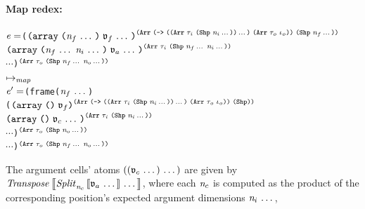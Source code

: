\begin{sproof}
  \paragraph{Map redex:}
  \newcommand{\mapfn}{\liftfn}
  \newcommand{\mapargannot}
  {\typearray
    {\type_i}
    {\idxshape{\sequence{\nat_f}\;\sequence{\nat_i}}}}
  \newcommand{\maparg}
  {\notedarrlit[\mapargannot]{\sequence{\atval_a}}{\sequence{\nat_f}\,\sequence{\nat_i}}}
  \newcommand{\mapresultannot}
  {\typearray
    {\type_o}
    {\idxshape{\sequence{\nat_f}\;\sequence{\nat_o}}}}
  \newcommand{\mapfncell}
  {\notedarrlit[{\typearray
      {\typefun
        {\sequence{\typearray{\type_i}{\idxshape{\sequence{\nat_i}}}}}
        {\typearray{\type_o}{\idx_o}}}
      {\idxshape{}}}]
    {\atval_f}{}}
  \newcommand{\mapargcell}
  {\notedarrlit[{\typearray{\type_i}{\idxshape{\sequence{\nat_i}}}}]
    {\sequence{\atval_c}}{}}
  \newcommand{\mappedargannot}
  {\typearray
    {\type_i}
    {\idxshape{\sequence{\nat_i}}}}
  \newcommand{\resultcellannot}
  {\typearray
    {\type_o}
    {\idxshape{\sequence{\nat_o}}}}
  \newcommand{\erasedmapfn}{\erasedliftfn}
  \newcommand{\erasedmaparg}
  {\arrlit{\sequence{\EraseA{\atval_a}}}{\sequence{\nat_f}\,\sequence{\nat_i}}}
  \newcommand{\erasedmapcell}{\idxshape{\sequence{\nat_i}}}
  \newcommand{\erasedmapresult}{\erasedliftresult}
  \newcommand{\erasedmapfncell}{\arrlit{\EraseA{\atval_f}}{}}
  \newcommand{\erasedmapargcell}{\arrlit{\sequence{\EraseA{\atval_c}}}{}}
\begin{alltt}
\(\expr = \)(\(\mapfn\)\\
\phantom{\(\expr = \) }\(\maparg\)\\
\phantom{\(\expr = \) }\(\cdots\))\(\sp{\mapresultannot}\)\\
\(\mapsto\sb{\mathit{map}}\)\\
\(\expr' = \)(frame (\(\sequence{\nat\sb{f}}\))\\
\phantom{\(\expr' = \) }(\(\mapfncell\)\\
\phantom{\(\expr' = \) \ }\(\mapargcell\)\\
\phantom{\(\expr' = \) \ }\(\cdots\))\(\sp{\resultcellannot}\)\\
\phantom{\(\expr' = \) }\(\cdots\))\(\sp{\mapresultannot}\)
\end{alltt}
The argument cells' atoms
$\left( \left( \mathfrak{v}_c \, \ldots \, \right) \, \ldots \, \right)$
are given by
$\mathit{Transpose} \left\llbracket \mathit{Split}_{\mathit{n}_c} \left\llbracket \mathfrak{v}_a \, \ldots \, \right\rrbracket \, \ldots \, \right\rrbracket$,
where
each $\mathit{n}_c$ is computed as the product of
the corresponding position's expected argument dimensions $\mathit{n}_i \, \ldots \,$,

\end{sproof}
